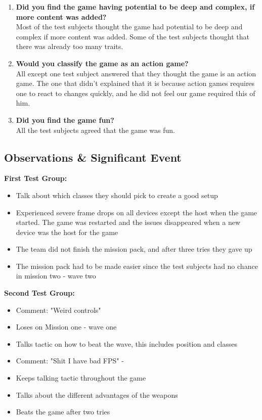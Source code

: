 \begin{enumerate}
\item \textbf{Did you find the game having potential to be deep and complex, if more content was added?}\vspace{4pt}\\
Most of the test subjects thought the game had potential to be deep and complex if more content was added.
Some of the test subjects thought that there was already too many traits.

\item \textbf{Would you classify the game as an action game?}\vspace{4pt}\\
All except one test subject answered that they thought the game is an action game.
The one that didn't explained that it is because action games requires one to react to changes quickly, and he did not feel our game required this of him.

\item \textbf{Did you find the game fun?}\vspace{4pt}\\
All the test subjects agreed that the game was fun.
\end{enumerate}

\subsection{Observations \& Significant Event}
\textbf{First Test Group:}\\
\begin{itemize}
\item Talk about which classes they should pick to create a good setup
\item Experienced severe frame drops on all devices except the host  when the game started. The game was restarted and the issues disappeared when a new device was the host for the game
\item The team did not finish the mission pack, and after three tries they gave up
\item The mission pack had to be made easier since the test subjects had no chance in mission two - wave two
\end{itemize}

\textbf{Second Test Group:}\\
\begin{itemize}
\item Comment: "Weird controls"
\item Loses on Mission one - wave one
\item Talks tactic on how to beat the wave, this includes position and classes
\item Comment: "Shit I have bad FPS" - 
\item Keeps talking tactic throughout the game
\item Talks about the different advantages of the weapons
\item Beats the game after two tries
\end{itemize}

